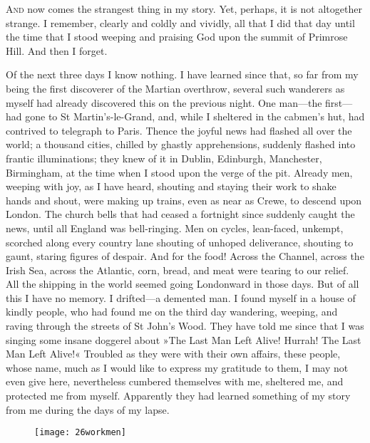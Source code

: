 

\lettrine[lines=4]{A}{nd} now comes the strangest thing in my story. Yet, perhaps, it is not altogether strange. I remember, clearly and coldly and vividly, all that I did that day until the time that I stood weeping and praising God upon the summit of Primrose Hill. And then I forget.

Of the next three days I know nothing. I have learned since that, so far from my being the first discoverer of the Martian overthrow, several such wanderers as myself had already discovered this on the previous night. One man—the first—had gone to St Martin's-le-Grand, and, while I sheltered in the cabmen's hut, had contrived to telegraph to Paris. Thence the joyful news had flashed all over the world; a thousand cities, chilled by ghastly apprehensions, suddenly flashed into frantic illuminations; they knew of it in Dublin, Edinburgh, Manchester, Birmingham, at the time when I stood upon the verge of the pit. Already men, weeping with joy, as I have heard, shouting and staying their work to shake hands and shout, were making up trains, even as near as Crewe, to descend upon London. The church bells that had ceased a fortnight since suddenly caught the news, until all England was bell-ringing. Men on cycles, lean-faced, unkempt, scorched along every country lane shouting of unhoped deliverance, shouting to gaunt, staring figures of despair. And for the food! Across the Channel, across the Irish Sea, across the Atlantic, corn, bread, and meat were tearing to our relief. All the shipping in the world seemed going Londonward in those days. But of all this I have no memory. I drifted—a demented man. I found myself in a house of kindly people, who had found me on the third day wandering, weeping, and raving through the streets of St John's Wood. They have told me since that I was singing some insane doggerel about »The Last Man Left Alive! Hurrah! The Last Man Left Alive!« Troubled as they were with their own affairs, these people, whose name, much as I would like to express my gratitude to them, I may not even give here, nevertheless cumbered themselves with me, sheltered me, and protected me from myself. Apparently they had learned something of my story from me during the days of my lapse.

\begin{figure}[tb]
\centering
\texttt{[image: 26workmen]}
\end{figure}

